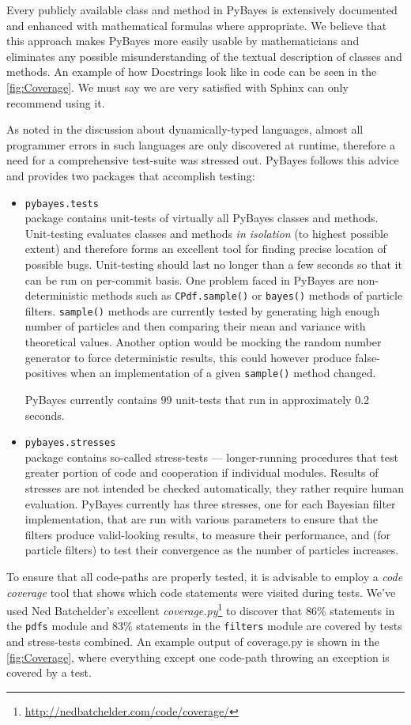 Every publicly available class and method in PyBayes is extensively documented and enhanced with
mathematical formulas where appropriate. We believe that this approach makes
PyBayes more easily usable by mathematicians and eliminates any possible misunderstanding of the textual
description of classes and methods. An example of how Docstrings look like in code can be seen in
the \autoref{fig:Coverage}. We must say we are very satisfied with Sphinx can only recommend using
it.

As noted in the discussion about dynamically-typed languages, almost all programmer errors in such
languages are only discovered at runtime, therefore a need for a comprehensive test-suite was
stressed out. PyBayes follows this advice and provides two packages that accomplish testing:
\begin{itemize}
	\item \verb|pybayes.tests| \\
		package contains unit-tests of virtually all PyBayes classes and methods. Unit-testing
		evaluates classes and methods \emph{in isolation} (to highest possible extent) and therefore
		forms an excellent tool for finding precise location of possible bugs. Unit-testing should
		last no longer than a few seconds so that it can be run on per-commit basis. One problem
		faced in PyBayes are non-deterministic methods such as \verb|CPdf.sample()| or
		\verb|bayes()| methods of particle filters. \verb|sample()| methods are currently tested
		by generating high enough number of particles and then comparing their mean and variance
		with theoretical values.
		Another option would be mocking the random number generator to force deterministic results,
		this could however produce false-positives when an implementation of a given \verb|sample()|
		method changed.

		PyBayes currently contains 99 unit-tests that run in approximately 0.2 seconds.
	\item \verb|pybayes.stresses| \\
		package contains so-called stress-tests --- longer-running procedures that test greater
		portion of code and cooperation if individual modules. Results of stresses are not intended
		be checked automatically, they rather require human evaluation. PyBayes currently has three
		stresses, one for each Bayesian filter implementation, that are run with various parameters
		to ensure that the filters produce valid-looking results, to measure their performance, and
		(for particle filters) to test their convergence as the number of particles increases.
\end{itemize}
To ensure that all code-paths are properly tested, it is advisable to employ a \emph{code coverage}
tool that shows which code statements were visited during tests. We've used Ned Batchelder's excellent
\emph{coverage.py}\footnote{\url{http://nedbatchelder.com/code/coverage/}} to discover that 86\%
statements in the \verb|pdfs| module and 83\% statements in the \verb|filters| module are covered
by tests and stress-tests combined. An example output of coverage.py is shown in the
\autoref{fig:Coverage}, where everything except one code-path throwing an exception is covered by
a test.

